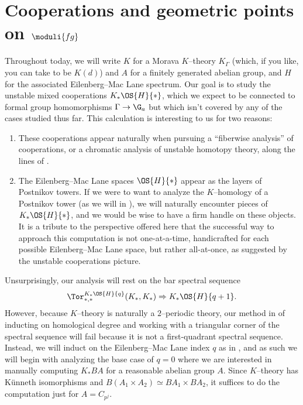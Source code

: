 \section{Cooperations and geometric points on $\moduli{fg}$}

Throughout today, we will write $K$ for a Morava $K$--theory $K_\Gamma$ (which, if you like, you can take to be $K(d)$) and $A$ for a finitely generated abelian group, and $H$ for the associated Eilenberg--Mac Lane spectrum.  Our goal is to study the unstable mixed cooperations $K_* \OS{H}{*}$, which we expect to be connected to formal group homomorphisms $\Gamma \to \G_a$ but which isn't covered by any of the cases studied thus far.  This calculation is interesting to us for two reasons:
\begin{enumerate}
\item These cooperations appear naturally when pursuing a ``fiberwise analysis'' of cooperations, or a chromatic analysis of unstable homotopy theory, along the lines of .
\item The Eilenberg--Mac Lane spaces $\OS{H}{*}$ appear as the layers of Postnikov towers.  If we were to want to analyze the $K$--homology of a Postnikov tower (as we will in ), we will naturally encounter pieces of $K_* \OS{H}{*}$, and we would be wise to have a firm handle on these objects.  It is a tribute to the perspective offered here that the successful way to approach this computation is not one-at-a-time, handicrafted for each possible Eilenberg--Mac Lane space, but rather all-at-once, as suggested by the unstable cooperations picture.
\end{enumerate}

Unsurprisingly, our analysis will rest on the bar spectral sequence \[\Tor^{K_* \OS{H}{q}}_{*, *}(K_*, K_*) \Rightarrow K_* \OS{H}{q+1}.\]  However, because $K$--theory is naturally a $2$--periodic theory, our method in  of inducting on homological degree and working with a triangular corner of the spectral sequence will fail because it is not a first-quadrant spectral sequence.  Instead, we will induct on the Eilenberg--Mac Lane index $q$ as in , and as such we will begin with analyzing the base case of $q = 0$ where we are interested in manually computing $K_* BA$ for a reasonable abelian group $A$.  Since $K$--theory has K\"unneth isomorphisms and $B(A_1 \times A_2) \simeq BA_1 \times BA_2$, it suffices to do the computation just for $A = C_{p^j}$. 

